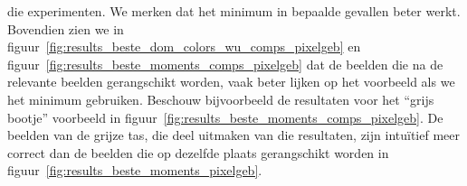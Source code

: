 die experimenten. We merken dat het minimum in bepaalde
gevallen beter werkt. Bovendien zien we in 
figuur~\ref{fig:results_beste_dom_colors_wu_comps_pixelgeb} en
figuur~\ref{fig:results_beste_moments_comps_pixelgeb} dat de beelden
die na de relevante beelden gerangschikt worden, vaak beter lijken op het voorbeeld als
we het minimum gebruiken. Beschouw bijvoorbeeld de resultaten voor het ``grijs bootje'' 
voorbeeld in figuur~\ref{fig:results_beste_moments_comps_pixelgeb}.
De beelden van de grijze tas, die deel uitmaken van die resultaten, zijn intu\"itief meer correct
dan de beelden die op dezelfde plaats gerangschikt worden in 
figuur~\ref{fig:results_beste_moments_pixelgeb}. 
